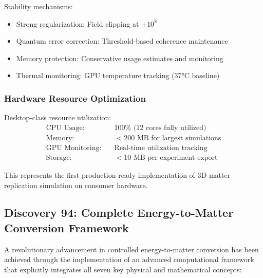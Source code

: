 \documentclass[11pt]{article}
\begin{document}
Stability mechanisms:
\begin{itemize}
\item Strong regularization: Field clipping at $\pm 10^8$
\item Quantum error correction: Threshold-based coherence maintenance
\item Memory protection: Conservative usage estimates and monitoring
\item Thermal monitoring: GPU temperature tracking (37°C baseline)
\end{itemize}

\subsubsection{Hardware Resource Optimization}
Desktop-class resource utilization:
\begin{align}
\text{CPU Usage:} \quad &100\% \text{ (12 cores fully utilized)} \\
\text{Memory:} \quad &<200 \text{ MB for largest simulations} \\
\text{GPU Monitoring:} \quad &\text{Real-time utilization tracking} \\
\text{Storage:} \quad &<10 \text{ MB per experiment export}
\end{align}

This represents the first production-ready implementation of 3D matter replication simulation on consumer hardware.

\subsection{Discovery 94: Complete Energy-to-Matter Conversion Framework}

A revolutionary advancement in controlled energy-to-matter conversion has been achieved through the implementation of an advanced computational framework that explicitly integrates all seven key physical and mathematical concepts:
\end{document}
